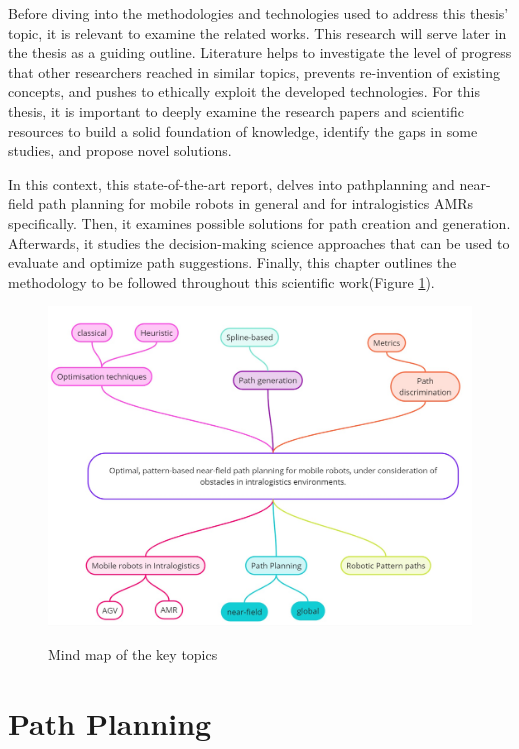 Before diving into the methodologies and technologies used to address this thesis’ 
topic, it is relevant to examine the related works. This research will serve later in 
the thesis as a guiding outline. Literature helps to investigate the level of progress that 
other researchers reached in similar topics, prevents re-invention of existing concepts, 
and pushes to ethically exploit the developed technologies. For this thesis, it is 
important to deeply examine the research papers and scientific resources to build a 
solid foundation of knowledge, identify the gaps in some studies, and propose novel 
solutions.  

In this context, this state-of-the-art report, delves 
into pathplanning and near-field path planning for mobile robots 
in general and for intralogistics AMRs specifically. Then, it examines possible 
solutions for path creation and generation. Afterwards, 
it studies the decision-making science approaches that can be used to evaluate and 
optimize path suggestions. Finally, this chapter 
outlines the methodology to be followed throughout this scientific work(Figure \ref{mindmap}).

\begin{figure}[H]
    \begin{center}
       \includegraphics[width=6in]{images/Chap1/Fig1.jpg}\\
       \caption{Mind map of the key topics}
       \label{mindmap}
       \end{center}
\end{figure}

\newpage
\section{Path Planning}

